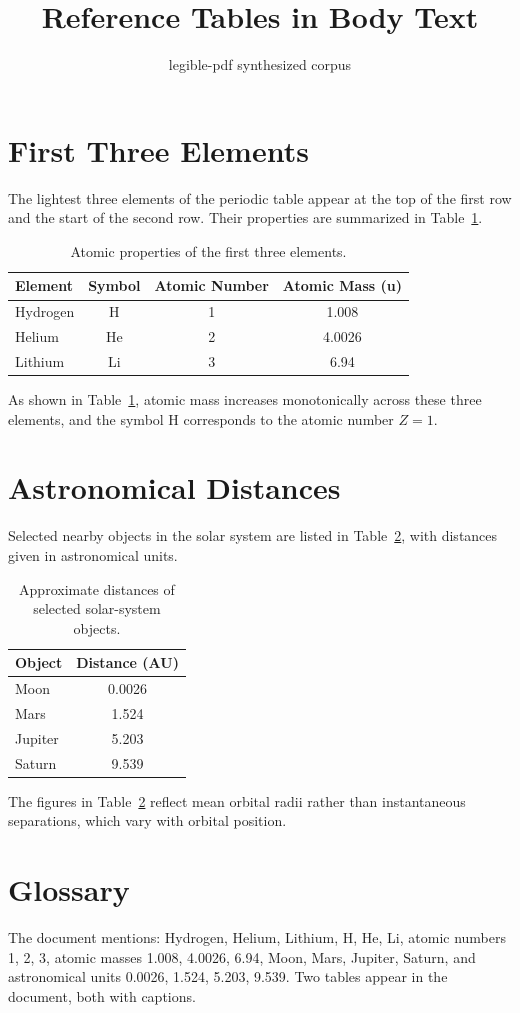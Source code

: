 \documentclass[12pt]{article}
\title{Reference Tables in Body Text}
\author{legible-pdf synthesized corpus}
\date{}
\begin{document}
\maketitle

\section{First Three Elements}

The lightest three elements of the periodic table appear at the top of the
first row and the start of the second row. Their properties are summarized
in Table~\ref{tab:elements}.

\begin{table}[h]
\centering
\caption{Atomic properties of the first three elements.}
\label{tab:elements}
\begin{tabular}{lccc}
\toprule
\textbf{Element} & \textbf{Symbol} & \textbf{Atomic Number} & \textbf{Atomic Mass (u)} \\
\midrule
Hydrogen & H & 1 & 1.008 \\
Helium   & He & 2 & 4.0026 \\
Lithium  & Li & 3 & 6.94 \\
\bottomrule
\end{tabular}
\end{table}

As shown in Table~\ref{tab:elements}, atomic mass increases monotonically
across these three elements, and the symbol $\mathrm{H}$ corresponds to
the atomic number $Z = 1$.

\section{Astronomical Distances}

Selected nearby objects in the solar system are listed in
Table~\ref{tab:distances}, with distances given in astronomical units.

\begin{table}[h]
\centering
\caption{Approximate distances of selected solar-system objects.}
\label{tab:distances}
\begin{tabular}{lc}
\toprule
\textbf{Object} & \textbf{Distance (AU)} \\
\midrule
Moon    & 0.0026 \\
Mars    & 1.524 \\
Jupiter & 5.203 \\
Saturn  & 9.539 \\
\bottomrule
\end{tabular}
\end{table}

The figures in Table~\ref{tab:distances} reflect mean orbital radii rather
than instantaneous separations, which vary with orbital position.

\section{Glossary}

The document mentions: Hydrogen, Helium, Lithium, H, He, Li,
atomic numbers 1, 2, 3, atomic masses 1.008, 4.0026, 6.94,
Moon, Mars, Jupiter, Saturn, and astronomical units 0.0026, 1.524,
5.203, 9.539. Two tables appear in the document, both with captions.
\end{document}
